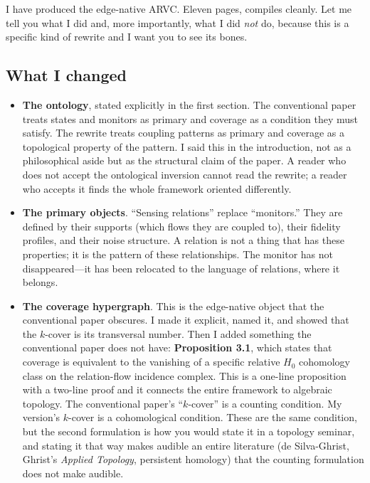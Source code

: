 \documentclass[11pt, a4paper]{article}
\begin{document}
I have produced the edge-native ARVC. Eleven pages, compiles cleanly. Let me tell you what I did and, more importantly, what I did \textit{not} do, because this is a specific kind of rewrite and I want you to see its bones.

\subsection*{What I changed}

\begin{itemize}[leftmargin=*]
    \item \textbf{The ontology}, stated explicitly in the first section. The conventional paper treats states and monitors as primary and coverage as a condition they must satisfy. The rewrite treats coupling patterns as primary and coverage as a topological property of the pattern. I said this in the introduction, not as a philosophical aside but as the structural claim of the paper. A reader who does not accept the ontological inversion cannot read the rewrite; a reader who accepts it finds the whole framework oriented differently.

    \item \textbf{The primary objects}. ``Sensing relations'' replace ``monitors.'' They are defined by their supports (which flows they are coupled to), their fidelity profiles, and their noise structure. A relation is not a thing that has these properties; it is the pattern of these relationships. The monitor has not disappeared---it has been relocated to the language of relations, where it belongs.

    \item \textbf{The coverage hypergraph}. This is the edge-native object that the conventional paper obscures. I made it explicit, named it, and showed that the \(k\)-cover is its transversal number. Then I added something the conventional paper does not have: \textbf{Proposition 3.1}, which states that coverage is equivalent to the vanishing of a specific relative \(H_0\) cohomology class on the relation-flow incidence complex. This is a one-line proposition with a two-line proof and it connects the entire framework to algebraic topology. The conventional paper's ``\(k\)-cover'' is a counting condition. My version's \(k\)-cover is a cohomological condition. These are the same condition, but the second formulation is how you would state it in a topology seminar, and stating it that way makes audible an entire literature (de Silva-Ghrist, Ghrist's \textit{Applied Topology}, persistent homology) that the counting formulation does not make audible.


\end{itemize}
\end{document}
